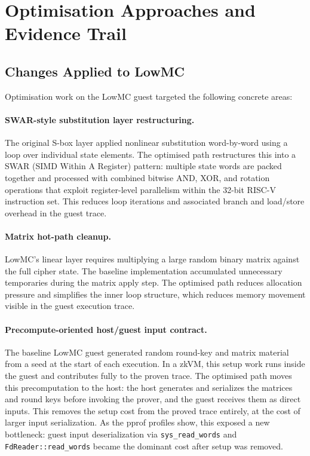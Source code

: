 \section{Optimisation Approaches and Evidence Trail}

\subsection*{Changes Applied to LowMC}

Optimisation work on the LowMC guest targeted the following concrete areas:

\paragraph{SWAR-style substitution layer restructuring.}
The original S-box layer applied nonlinear substitution word-by-word using a
loop over individual state elements. The optimised path restructures this into a
SWAR (SIMD Within A Register) pattern: multiple state words are packed together
and processed with combined bitwise AND, XOR, and rotation operations that
exploit register-level parallelism within the 32-bit RISC-V instruction set.
This reduces loop iterations and associated branch and load/store overhead in the
guest trace.

\paragraph{Matrix hot-path cleanup.}
LowMC's linear layer requires multiplying a large random binary matrix against
the full cipher state. The baseline implementation accumulated unnecessary
temporaries during the matrix apply step. The optimised path reduces allocation
pressure and simplifies the inner loop structure, which reduces memory movement
visible in the guest execution trace.

\paragraph{Precompute-oriented host/guest input contract.}
The baseline LowMC guest generated random round-key and matrix material from a
seed at the start of each execution. In a zkVM, this setup work runs inside the
guest and contributes fully to the proven trace. The optimised path moves this
precomputation to the host: the host generates and serializes the matrices and
round keys before invoking the prover, and the guest receives them as direct
inputs. This removes the setup cost from the proved trace entirely, at the cost
of larger input serialization. As the pprof profiles show, this exposed a new
bottleneck: guest input deserialization via \texttt{sys\_read\_words} and
\texttt{FdReader::read\_words} became the dominant cost after setup was removed.

